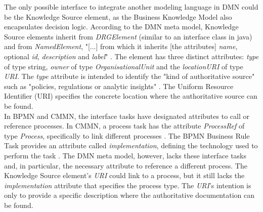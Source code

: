 The only possible interface to integrate another modeling language in DMN could be the Knowledge Source element, as the Business Knowledge Model also encapsulates decision logic. According to the DMN meta model, Knowledge Source elements inherit from \textit{DRGElement} (similar to an interface class in java) and from \textit{NamedElement}, "[...] from which it inherits [the attributes] \textit{name}, optional \textit{id}, \textit{description} and \textit{label}" \cite{DMNspec2016}. The element has three distinct attributes: \textit{type} of type string, \textit{owner} of type \textit{OrganisationalUnit} and the \textit{locationURI} of type \textit{URI}. The \textit{type} attribute is intended to identify the "kind of authoritative source" such as "policies, regulations or analytic insights" \cite{DMNspec2016}. The Uniform Resource Identifier (URI) specifies the concrete location where the authoritative source can be found. \\
In BPMN and CMMN, the interface tasks have designated attributes to call or reference processes. In CMMN, a process task has the attribute \textit{ProcessRef} of type \textit{Process}, specifically to link different processes \cite{CMMNspec2014}. The BPMN Business Rule Task provides an attribute called \textit{implementation}, defining the technology used to perform the task \cite{BPMNspec}. The DMN meta model, however, lacks these interface tasks and, in particular, the necessary attribute to reference a different process. The Knowledge Source element's \textit{URI} could link to a process, but it still lacks the \textit{implementation} attribute that specifies the process type. The \textit{URI}'s intention is only to provide a specific description where the authoritative documentation can be found.

